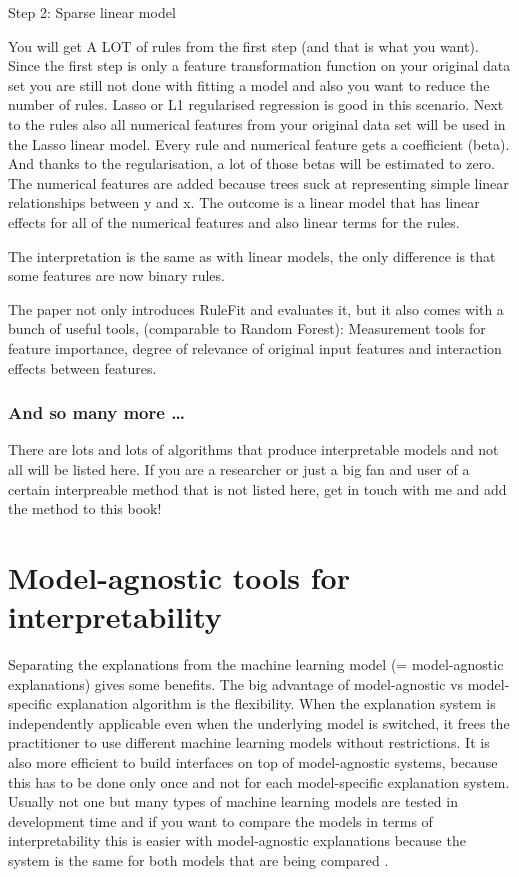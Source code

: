 \documentclass[12pt,]{krantz}
\theoremstyle{definition}
\theoremstyle{definition}
\theoremstyle{definition}
\theoremstyle{remark}
\begin{document}
Step 2: Sparse linear model

You will get A LOT of rules from the first step (and that is what you
want). Since the first step is only a feature transformation function on
your original data set you are still not done with fitting a model and
also you want to reduce the number of rules. Lasso or L1 regularised
regression is good in this scenario. Next to the rules also all
numerical features from your original data set will be used in the Lasso
linear model. Every rule and numerical feature gets a coefficient
(beta). And thanks to the regularisation, a lot of those betas will be
estimated to zero. The numerical features are added because trees suck
at representing simple linear relationships between y and x. The outcome
is a linear model that has linear effects for all of the numerical
features and also linear terms for the rules.

The interpretation is the same as with linear models, the only
difference is that some features are now binary rules.

The paper not only introduces RuleFit and evaluates it, but it also
comes with a bunch of useful tools, (comparable to Random Forest):
Measurement tools for feature importance, degree of relevance of
original input features and interaction effects between features.

\subsection{And so many more \ldots{}}\label{and-so-many-more}

There are lots and lots of algorithms that produce interpretable models
and not all will be listed here. If you are a researcher or just a big
fan and user of a certain interpreable method that is not listed here,
get in touch with me and add the method to this book!

\chapter{Model-agnostic tools for interpretability}\label{agnostic}

Separating the explanations from the machine learning model (=
model-agnostic explanations) gives some benefits. The big advantage of
model-agnostic vs model-specific explanation algorithm is the
flexibility. When the explanation system is independently applicable
even when the underlying model is switched, it frees the practitioner to
use different machine learning models without restrictions. It is also
more efficient to build interfaces on top of model-agnostic systems,
because this has to be done only once and not for each model-specific
explanation system. Usually not one but many types of machine learning
models are tested in development time and if you want to compare the
models in terms of interpretability this is easier with model-agnostic
explanations because the system is the same for both models that are
being compared \citep{Ribeiro2016b}.
\end{document}
